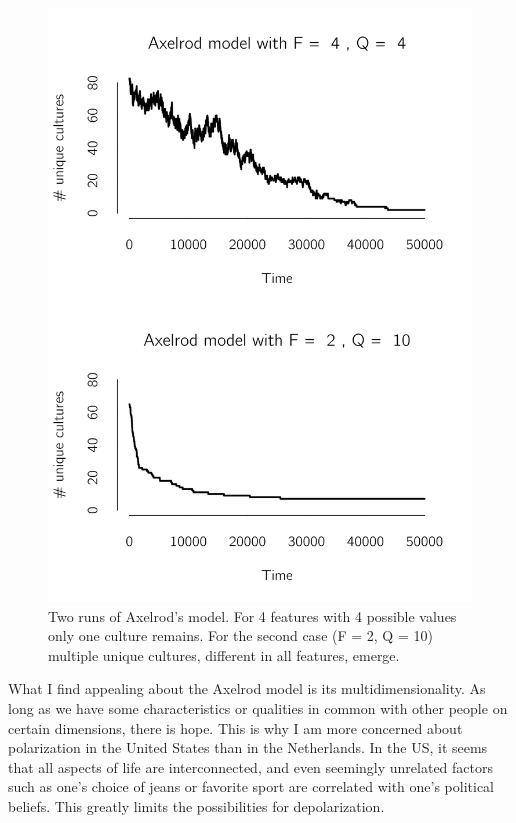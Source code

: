 \documentclass[
  a4paper,
  DIV=11,
  numbers=noendperiod,
  oneside]{scrreprt}
\begin{document}
\begin{figure}

{\centering \includegraphics{media/ch7/fig-ch7-img4-old-92.png}

}

\caption{\label{fig-ch7-img4-old-92}Two runs of Axelrod's model. For 4
features with 4 possible values only one culture remains. For the second
case (F = 2, Q = 10) multiple unique cultures, different in all
features, emerge.}

\end{figure}

What I find appealing about the Axelrod model is its
multidimensionality. As long as we have some characteristics or
qualities in common with other people on certain dimensions, there is
hope. This is why I am more concerned about polarization in the United
States than in the Netherlands. In the US, it seems that all aspects of
life are interconnected, and even seemingly unrelated factors such as
one's choice of jeans or favorite sport are correlated with one's
political beliefs. This greatly limits the possibilities for
depolarization.
\end{document}
